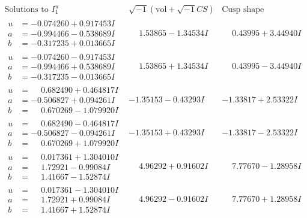 \documentclass[1p]{elsarticle_modified}
\theoremstyle{definition}
\newcommand{\I}{\sqrt{-1}}
\begin{document}
$$\begin{array}{c|c|c}  
\text{Solutions to }I^u_{1}& \I (\text{vol} + \sqrt{-1}CS) & \text{Cusp shape}\\
 \hline 
\begin{aligned}
u &= -0.074260 + 0.917453 I \\
a &= -0.994466 - 0.538689 I \\
b &= -0.317235 + 0.013665 I\end{aligned}
 & \phantom{-}1.53865 - 1.34534 I & \phantom{-}0.43995 + 3.44940 I \\ \hline\begin{aligned}
u &= -0.074260 - 0.917453 I \\
a &= -0.994466 + 0.538689 I \\
b &= -0.317235 - 0.013665 I\end{aligned}
 & \phantom{-}1.53865 + 1.34534 I & \phantom{-}0.43995 - 3.44940 I \\ \hline\begin{aligned}
u &= \phantom{-}0.682490 + 0.464817 I \\
a &= -0.506827 + 0.094261 I \\
b &= \phantom{-}0.670269 - 1.079920 I\end{aligned}
 & -1.35153 - 0.43293 I & -1.33817 + 2.53322 I \\ \hline\begin{aligned}
u &= \phantom{-}0.682490 - 0.464817 I \\
a &= -0.506827 - 0.094261 I \\
b &= \phantom{-}0.670269 + 1.079920 I\end{aligned}
 & -1.35153 + 0.43293 I & -1.33817 - 2.53322 I \\ \hline\begin{aligned}
u &= \phantom{-}0.017361 + 1.304010 I \\
a &= \phantom{-}1.72921 - 0.99084 I \\
b &= \phantom{-}1.41667 - 1.52874 I\end{aligned}
 & \phantom{-}4.96292 + 0.91602 I & \phantom{-}7.77670 - 1.28958 I \\ \hline\begin{aligned}
u &= \phantom{-}0.017361 - 1.304010 I \\
a &= \phantom{-}1.72921 + 0.99084 I \\
b &= \phantom{-}1.41667 + 1.52874 I\end{aligned}
 & \phantom{-}4.96292 - 0.91602 I & \phantom{-}7.77670 + 1.28958 I \\ \hline\begin{aligned}

\end{aligned}
\end{array}$$
\end{document}
